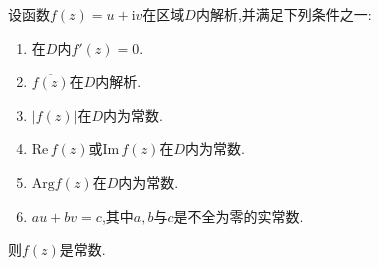 \documentclass[../../main.tex]{subfiles}%
\begin{document}
\begin{proposition}\label{proposition:复变函数导数为0必是常函数}
设函数$f(z)=u+\mathrm{i}v$在区域$D$内解析,并满足下列条件之一:
\begin{enumerate}[(1)]
\item
\label{proposition:复变函数导数为0必是常函数-1} 在$D$内$f'(z)=0$.

\item\label{proposition:复变函数导数为0必是常函数-2} $\overline{f(z)}$在$D$内解析.

\item\label{proposition:复变函数导数为0必是常函数-3} $|f(z)|$在$D$内为常数.

\item\label{proposition:复变函数导数为0必是常函数-4} $\mathrm{Re}\,f(z)$或$\mathrm{Im}\,f(z)$在$D$内为常数.

\item\label{proposition:复变函数导数为0必是常函数-6} $\mathrm{Arg}f\left( z \right) $在$D$内为常数.

\item\label{proposition:复变函数导数为0必是常函数-5} $au+bv=c$,其中$a,b$与$c$是不全为零的实常数.
\end{enumerate}
则$f(z)$是常数.
\end{proposition}
\end{document}
